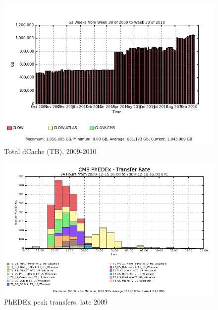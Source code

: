\documentclass{beamer}
\begin{document}
\begin{frame}
\begin{figure}
    \includegraphics[width=.8\textwidth]{Graphics/sespace.png}
    \caption{Total dCache (TB), 2009-2010}
\end{figure}
\end{frame}

\begin{frame}
\begin{figure}
	\includegraphics[width=\textwidth]{Graphics/phedex_prod_xfer_rates_Dec2009.png}
	\caption{PhEDEx peak transfers, late 2009}
\end{figure}
\end{frame}
\end{document}

